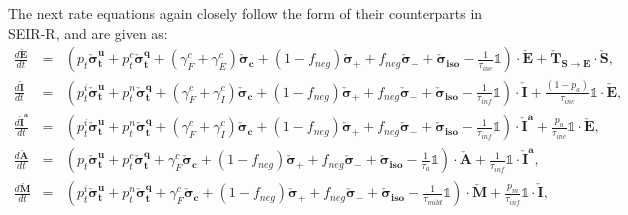 \documentclass[notitlepage, superscriptaddress]{revtex4-2}
\begin{document}
The next rate equations again closely follow the form of their counterparts in SEIR-R, and are given as:
\begin{eqnarray}
%
\frac{d \boldsymbol{\check{E}}}{dt} &=& \left( p_{t} \boldsymbol{\check{\sigma}^{u}_{t}} + p^{c}_{t} \boldsymbol{\check{\sigma}^{q}_{t}} + (\gamma^{c}_{F} + \gamma^{c}_{E}) \boldsymbol{\check{\sigma}_{c}} + (1-f_{neg}) \boldsymbol{\check{\sigma}_{+}} + f_{neg} \boldsymbol{\check{\sigma}_{-}} + \boldsymbol{\check{\sigma}_{iso}} - \frac{1}{\tau_{inc}} \mathbb{1} \right) \cdot \boldsymbol{\check{E}} + \boldsymbol{\check{T}_{S \rightarrow E}} \cdot \boldsymbol{\check{S}}, \\
%
\frac{d \boldsymbol{\check{I}}}{dt} &=& \left( p^{i}_{t} \boldsymbol{\check{\sigma}^{u}_{t}} + p^{n}_{t} \boldsymbol{\check{\sigma}^{q}_{t}} + (\gamma^{c}_{F} + \gamma^{c}_{I}) \boldsymbol{\check{\sigma}_{c}} + (1-f_{neg}) \boldsymbol{\check{\sigma}_{+}} + f_{neg} \boldsymbol{\check{\sigma}_{-}} + \boldsymbol{\check{\sigma}_{iso}} - \frac{1}{\tau_{inf}} \mathbb{1} \right) \cdot \boldsymbol{\check{I}} + \frac{(1-p_{a})}{\tau_{inc}} \mathbb{1} \cdot \boldsymbol{\check{E}}, \\ 
%
\frac{d \boldsymbol{\check{I}^{a}}}{dt} &=& \left( p^{i}_{t} \boldsymbol{\check{\sigma}^{u}_{t}} + p^{n}_{t} \boldsymbol{\check{\sigma}^{q}_{t}} + (\gamma^{c}_{F} + \gamma^{c}_{I}) \boldsymbol{\check{\sigma}_{c}} + (1-f_{neg}) \boldsymbol{\check{\sigma}_{+}} + f_{neg} \boldsymbol{\check{\sigma}_{-}} + \boldsymbol{\check{\sigma}_{iso}} - \frac{1}{\tau_{inf}} \mathbb{1} \right) \cdot \boldsymbol{\check{I}^{a}} + \frac{p_{a}}{\tau_{inc}} \mathbb{1} \cdot \boldsymbol{\check{E}}, \\
%
\frac{d \boldsymbol{\check{A}}}{dt} &=& \left( p_{t} \boldsymbol{\check{\sigma}^{u}_{t}} + p^{c}_{t} \boldsymbol{\check{\sigma}^{q}_{t}} + \gamma^{c}_{F} \boldsymbol{\check{\sigma}_{c}} + (1-f_{neg}) \boldsymbol{\check{\sigma}_{+}} + f_{neg} \boldsymbol{\check{\sigma}_{-}} + \boldsymbol{\check{\sigma}_{iso}} - \frac{1}{\tau_{a}} \mathbb{1} \right) \cdot \boldsymbol{\check{A}} + \frac{1}{\tau_{inf}} \mathbb{1} \cdot \boldsymbol{\check{I}^{a}}, \\
%
\frac{d \boldsymbol{\check{M}}}{dt} &=& \left( p^{i}_{t} \boldsymbol{\check{\sigma}^{u}_{t}} + p^{n}_{t} \boldsymbol{\check{\sigma}^{q}_{t}} + \gamma^{c}_{F} \boldsymbol{\check{\sigma}_{c}} + (1-f_{neg}) \boldsymbol{\check{\sigma}_{+}} + f_{neg} \boldsymbol{\check{\sigma}_{-}} + \boldsymbol{\check{\sigma}_{iso}} - \frac{1}{\tau_{mild}} \mathbb{1} \right) \cdot \boldsymbol{\check{M}} + \frac{p_{m}}{\tau_{inf}} \mathbb{1} \cdot \boldsymbol{\check{I}}, \\ 

\end{eqnarray}
\end{document}
